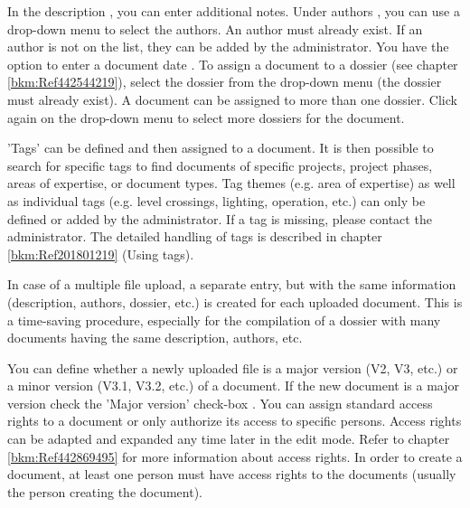 
In the description , you can enter additional notes. Under authors , you can use a drop-down menu to select the authors. An author must already exist. If an author is not on the list, they can be added by the administrator. You have the option to enter a document date . To assign a document to a dossier (see chapter \ref{bkm:Ref442544219}), select the dossier from the drop-down menu  (the dossier must already exist). A document can be assigned to more than one dossier. Click again on the drop-down menu to select more dossiers for the document.

'Tags'  can be defined and then assigned to a document. It is then possible to search for specific tags to find documents of specific projects, project phases, areas of expertise, or document types. Tag themes (e.g. area of expertise) as well as individual tags (e.g. level crossings, lighting, operation, etc.) can only be defined or added by the administrator. If a tag is missing, please contact the administrator. The detailed handling of tags is described in chapter \ref{bkm:Ref201801219} (Using tags). \newline

In case of a multiple file upload, a separate entry, but with the same information (description, authors, dossier, etc.) is created for each uploaded document. This is a time-saving procedure, especially for the compilation of a dossier with many documents having the same description, authors, etc. \newline


You can define whether a newly uploaded file is a major version (V2, V3, etc.) or a minor version (V3.1, V3.2, etc.) of a document. If the new document is a major version check the 'Major version' check-box . You can assign standard access rights to a document  or only authorize its access to specific persons. Access rights can be adapted and expanded any time later in the edit mode. Refer to chapter \ref{bkm:Ref442869495} for more information about access rights. In order to create a document, at least one person must have access rights to the documents (usually the person creating the document).

